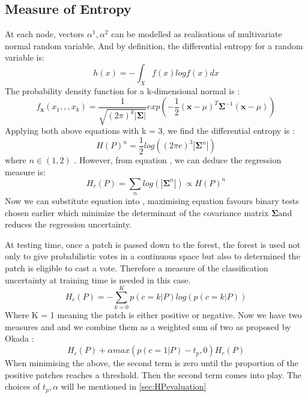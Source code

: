 \subsection{Measure of Entropy}
\label{subsec:measureofentropy}
At each node, vectors $\alpha ^{1}, \alpha ^{2}$ can be modelled as realisations of multivariate normal random variable. \cite{DRFHP} And by definition, the differential entropy for a random variable is: 
\begin{equation}
\label{eq:diffentropy}
h(x) = -\int_X f(x) log f(x) dx 
\end{equation}
 The probability density function for a k-dimensional normal is :
\begin{equation}
\label{eq:mvnormal}
f_{\textbf{x}}(x_{1}, , ,x_{k}) = \frac{1}{\sqrt{(2\pi)^{k}|\mathbf{\Sigma}|}}exp(- \frac{1}{2}(\mathbf{x}-\mu)^{T}\mathbf{\Sigma}^{-1}(\mathbf{x}-\mu))
\end{equation}
Applying both above equations with k = 3, we find the differential entropy is :
\begin{equation}
\label{eq:df1}
H(P)^{n} = \frac{1}{2}log((2\pi e)^{3}|\mathbf{\Sigma}^{n}|)
\end{equation}
where $ n \in (1,2)$ . However, from equation , we can deduce the regression measure is:
\begin{equation}
\label{eq:rm1}
H_{r}(P) = \sum\limits_{n}log(|\mathbf{\Sigma}^{n}|) \propto H(P)^{n}
\end{equation} 
Now we can substitute equation  into , maximising equation  favours binary tests chosen earlier which minimize the determinant of the covariance matrix $\mathbf{\Sigma} $and reduces the regression uncertainty. \cite{GFRF,DRFHP}

At testing time, once a patch is passed down to the forest, the forest is used not only to give probabilistic votes in a continuous space but also to determined the patch is eligible to cast a vote. Therefore a measure of the classification uncertainty at training time is needed in this case. \cite{GFRF,DRFHP}
\begin{equation}
\label{eq:cumeasure}
H_{c}(P) = - \sum\limits_{k=0}^K p(c=k|P)log(p(c=k|P))
\end{equation}
Where K = 1 meaning the patch is either positive or negative.  Now we have two measures  and  and we combine them as a weighted sum of two as proposed by Okada \cite{okada,GFRF}:
\begin{equation}
\label{eq:okada}
H_{c}(P) + \alpha max(p(c=1|P)-t_{p},0)H_{r}(P)
\end{equation}
When minimising the above, the second term is zero until the proportion of the positive patches reaches a threshold. Then the second term comes into play. The choices of $t_{p}, \alpha$ will be mentioned in \ref{sec:HPevaluation}

